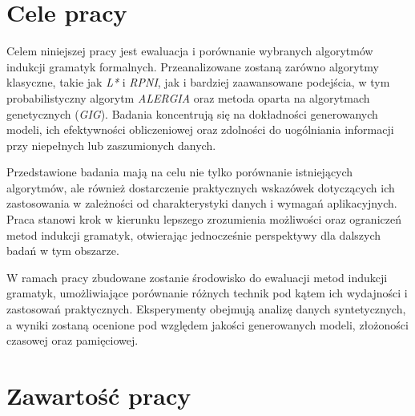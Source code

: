 
\section{Cele pracy}
\label{sec:celePracy}


Celem niniejszej pracy jest ewaluacja i porównanie wybranych algorytmów indukcji gramatyk formalnych. Przeanalizowane zostaną zarówno algorytmy klasyczne, takie jak \textit{L*} i \textit{RPNI}, jak i bardziej zaawansowane podejścia, w tym probabilistyczny algorytm \textit{ALERGIA} oraz metoda oparta na algorytmach genetycznych (\textit{GIG}). Badania koncentrują się na dokładności generowanych modeli, ich efektywności obliczeniowej oraz zdolności do uogólniania informacji przy niepełnych lub zaszumionych danych.

Przedstawione badania mają na celu nie tylko porównanie istniejących algorytmów, ale również dostarczenie praktycznych wskazówek dotyczących ich zastosowania w zależności od charakterystyki danych i wymagań aplikacyjnych. Praca stanowi krok w kierunku lepszego zrozumienia możliwości oraz ograniczeń metod indukcji gramatyk, otwierając jednocześnie perspektywy dla dalszych badań w tym obszarze.  

W ramach pracy zbudowane zostanie środowisko do ewaluacji metod indukcji gramatyk, umożliwiające porównanie różnych technik pod kątem ich wydajności i zastosowań praktycznych. Eksperymenty obejmują analizę danych syntetycznych, a wyniki zostaną ocenione pod względem jakości generowanych modeli, złożoności czasowej oraz pamięciowej. 


\section{Zawartość pracy}
\label{sec:zawartoscPracy}


